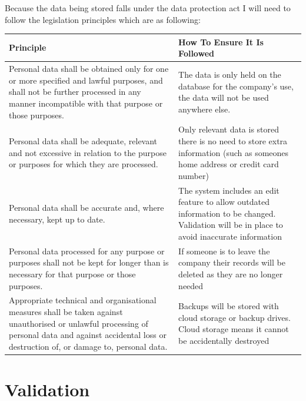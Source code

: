 Because the data being stored falls under the data protection act I will need to follow the legislation principles which are as following:


\begin{center}
    \begin{tabular}{|p{5cm}|p{6cm}|}
        \hline
        \textbf{Principle} & \textbf{How To Ensure It Is Followed}\\ \hline
Personal data shall be obtained only for one or more specified and lawful purposes, and shall not be further processed in any manner incompatible with that purpose or those purposes. & The data is only held on the database for the company's use, the data will not be used anywhere else. \\ \hline
Personal data shall be adequate, relevant and not excessive in relation to the purpose or purposes for which they are processed. & Only relevant data is stored there is no need to store extra information (such as someones home address or credit card number) \\ \hline
Personal data shall be accurate and, where necessary, kept up to date. & The system includes an edit feature to allow outdated information to be changed. Validation will be in place to avoid inaccurate information \\ \hline
Personal data processed for any purpose or purposes shall not be kept for longer than is necessary for that purpose or those purposes. & If someone is to leave the company their records will be deleted as they are no longer needed \\ \hline
Appropriate technical and organisational measures shall be taken against unauthorised or unlawful processing of personal data and against accidental loss or destruction of, or damage to, personal data. & Backups will be stored with cloud storage or backup drives. Cloud storage means it cannot be accidentally destroyed \\ \hline
    \end{tabular}
\end{center}

\section{Validation}

